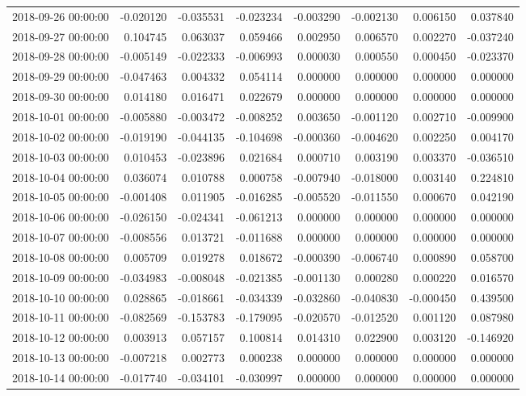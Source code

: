 \begin{tabular}{lrrrrrrr}
2018-09-26 00:00:00 & -0.020120 & -0.035531 & -0.023234 & -0.003290 & -0.002130 & 0.006150 & 0.037840 \\
2018-09-27 00:00:00 & 0.104745 & 0.063037 & 0.059466 & 0.002950 & 0.006570 & 0.002270 & -0.037240 \\
2018-09-28 00:00:00 & -0.005149 & -0.022333 & -0.006993 & 0.000030 & 0.000550 & 0.000450 & -0.023370 \\
2018-09-29 00:00:00 & -0.047463 & 0.004332 & 0.054114 & 0.000000 & 0.000000 & 0.000000 & 0.000000 \\
2018-09-30 00:00:00 & 0.014180 & 0.016471 & 0.022679 & 0.000000 & 0.000000 & 0.000000 & 0.000000 \\
2018-10-01 00:00:00 & -0.005880 & -0.003472 & -0.008252 & 0.003650 & -0.001120 & 0.002710 & -0.009900 \\
2018-10-02 00:00:00 & -0.019190 & -0.044135 & -0.104698 & -0.000360 & -0.004620 & 0.002250 & 0.004170 \\
2018-10-03 00:00:00 & 0.010453 & -0.023896 & 0.021684 & 0.000710 & 0.003190 & 0.003370 & -0.036510 \\
2018-10-04 00:00:00 & 0.036074 & 0.010788 & 0.000758 & -0.007940 & -0.018000 & 0.003140 & 0.224810 \\
2018-10-05 00:00:00 & -0.001408 & 0.011905 & -0.016285 & -0.005520 & -0.011550 & 0.000670 & 0.042190 \\
2018-10-06 00:00:00 & -0.026150 & -0.024341 & -0.061213 & 0.000000 & 0.000000 & 0.000000 & 0.000000 \\
2018-10-07 00:00:00 & -0.008556 & 0.013721 & -0.011688 & 0.000000 & 0.000000 & 0.000000 & 0.000000 \\
2018-10-08 00:00:00 & 0.005709 & 0.019278 & 0.018672 & -0.000390 & -0.006740 & 0.000890 & 0.058700 \\
2018-10-09 00:00:00 & -0.034983 & -0.008048 & -0.021385 & -0.001130 & 0.000280 & 0.000220 & 0.016570 \\
2018-10-10 00:00:00 & 0.028865 & -0.018661 & -0.034339 & -0.032860 & -0.040830 & -0.000450 & 0.439500 \\
2018-10-11 00:00:00 & -0.082569 & -0.153783 & -0.179095 & -0.020570 & -0.012520 & 0.001120 & 0.087980 \\
2018-10-12 00:00:00 & 0.003913 & 0.057157 & 0.100814 & 0.014310 & 0.022900 & 0.003120 & -0.146920 \\
2018-10-13 00:00:00 & -0.007218 & 0.002773 & 0.000238 & 0.000000 & 0.000000 & 0.000000 & 0.000000 \\
2018-10-14 00:00:00 & -0.017740 & -0.034101 & -0.030997 & 0.000000 & 0.000000 & 0.000000 & 0.000000 \\

\end{tabular}
